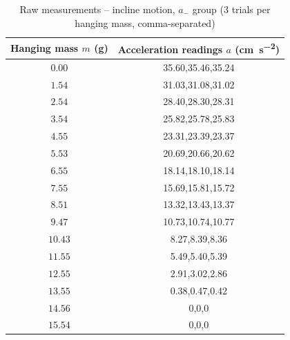 \begin{table}[htb!]
\centering
\caption{Raw measurements -- incline motion, $a_{-}$ group (3 trials per hanging mass, comma-separated)}
\begin{tabular}{cc}
\toprule
Hanging mass $m$ (\unit{\g}) & Acceleration readings $a$ (\unit{\cm\per\s\squared}) \\
\midrule
$0.00$ & 35.60,35.46,35.24 \\
$1.54$ & 31.03,31.08,31.02 \\
$2.54$ & 28.40,28.30,28.31 \\
$3.54$ & 25.82,25.78,25.83 \\
$4.55$ & 23.31,23.39,23.37 \\
$5.53$ & 20.69,20.66,20.62 \\
$6.55$ & 18.14,18.10,18.14 \\
$7.55$ & 15.69,15.81,15.72 \\
$8.51$ & 13.32,13.43,13.37 \\
$9.47$ & 10.73,10.74,10.77 \\
$10.43$ & 8.27,8.39,8.36 \\
$11.55$ & 5.49,5.40,5.39 \\
$12.55$ & 2.91,3.02,2.86 \\
$13.55$ & 0.38,0.47,0.42 \\
$14.56$ & 0,0,0 \\
$15.54$ & 0,0,0 \\
\bottomrule
\end{tabular}
\end{table}
